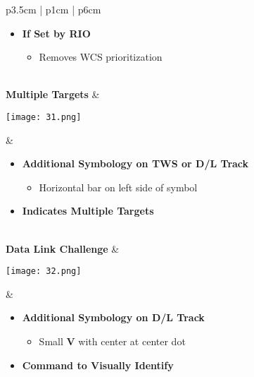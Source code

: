 \documentclass[8pt,usenames,dvipsnames,twoside]{article}
\begin{document}
\begin{center}
\begin{longtable}{p{3.5cm} | p{1cm} |  p{6cm}}
\begin{minipage}[t]{\linewidth}
\begin{itemize}
\begin{itemize}
						\end{itemize}
						\item \textbf{If Set by RIO}
						\begin{itemize}
							\item Removes WCS prioritization
						\end{itemize}
					\end{itemize}
				\end{minipage} \\
				\midrule
				\textbf{Multiple Targets} &
				\begin{minipage}[t]{\linewidth}
					\vspace{-7pt}
					\centering
					\texttt{[image: 31.png]}
				\end{minipage} &  
				\begin{minipage}[t]{\linewidth}
					\vspace{-7pt}
					\begin{itemize}
						\item \textbf{Additional Symbology on TWS or D/L Track}
						\begin{itemize}
							\item Horizontal bar on left side of symbol
						\end{itemize}
						\item \textbf{Indicates Multiple Targets}
					\end{itemize}
				\end{minipage} \\
				\midrule
				\textbf{Data Link Challenge} &
				\begin{minipage}[t]{\linewidth}
					\vspace{-7pt}
					\centering
					\texttt{[image: 32.png]}
				\end{minipage} &  
				\begin{minipage}[t]{\linewidth}
					\vspace{-7pt}
					\begin{itemize}
						\item \textbf{Additional Symbology on D/L Track}
						\begin{itemize}
							\item Small \textbf{V} with center at center dot
						\end{itemize}
						\item \textbf{Command to Visually Identify}
					\end{itemize}
				\end{minipage} \\

\end{longtable}
\end{center}
\end{document}
